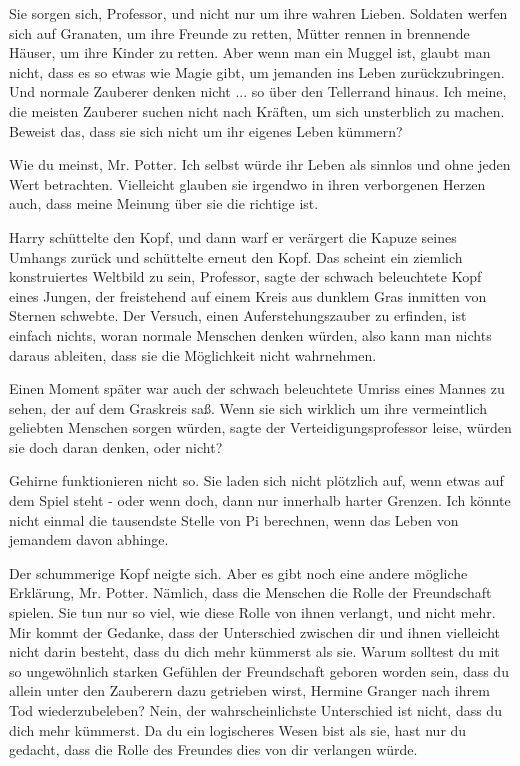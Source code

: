 \glqq{}Sie sorgen sich, Professor, und nicht nur um ihre wahren Lieben. Soldaten
werfen sich auf Granaten, um ihre Freunde zu retten, Mütter rennen in brennende
Häuser, um ihre Kinder zu retten. Aber wenn man ein Muggel ist, glaubt man
nicht, dass es so etwas wie Magie gibt, um jemanden ins Leben zurückzubringen.
Und normale Zauberer denken nicht ... so über den Tellerrand hinaus. Ich meine,
die meisten Zauberer suchen nicht nach Kräften, um sich unsterblich zu machen.
Beweist das, dass sie sich nicht um ihr eigenes Leben kümmern?\grqq{}

\glqq{}Wie du meinst, Mr. Potter. Ich selbst würde ihr Leben als sinnlos und ohne
jeden Wert betrachten. Vielleicht glauben sie irgendwo in ihren verborgenen
Herzen auch, dass meine Meinung über sie die richtige ist.\grqq{}

Harry schüttelte den Kopf, und dann warf er verärgert die Kapuze seines Umhangs
zurück und schüttelte erneut den Kopf. \glqq{}Das scheint ein ziemlich
konstruiertes Weltbild zu sein, Professor\grqq{}, sagte der schwach beleuchtete
Kopf eines Jungen, der freistehend auf einem Kreis aus dunklem Gras inmitten von
Sternen schwebte. \glqq{}Der Versuch, einen Auferstehungszauber zu erfinden, ist
einfach nichts, woran normale Menschen denken würden, also kann man nichts
daraus ableiten, dass sie die Möglichkeit nicht wahrnehmen.\grqq{}

Einen Moment später war auch der schwach beleuchtete Umriss eines Mannes zu
sehen, der auf dem Graskreis saß. \glqq{}Wenn sie sich wirklich um ihre
vermeintlich geliebten Menschen sorgen würden\grqq{}, sagte der
Verteidigungsprofessor leise, \glqq{}würden sie doch daran denken, oder
nicht?\grqq{}

\glqq{}Gehirne funktionieren nicht so. Sie laden sich nicht plötzlich auf, wenn
etwas auf dem Spiel steht - oder wenn doch, dann nur innerhalb harter Grenzen.
Ich könnte nicht einmal die tausendste Stelle von Pi berechnen, wenn das Leben
von jemandem davon abhinge.\grqq{}

Der schummerige Kopf neigte sich. \glqq{}Aber es gibt noch eine andere mögliche
Erklärung, Mr. Potter. Nämlich, dass die Menschen die Rolle der Freundschaft
spielen. Sie tun nur so viel, wie diese Rolle von ihnen verlangt, und nicht
mehr. Mir kommt der Gedanke, dass der Unterschied zwischen dir und ihnen
vielleicht nicht darin besteht, dass du dich mehr kümmerst als sie. Warum
solltest du mit so ungewöhnlich starken Gefühlen der Freundschaft geboren worden
sein, dass du allein unter den Zauberern dazu getrieben wirst, Hermine Granger
nach ihrem Tod wiederzubeleben? Nein, der wahrscheinlichste Unterschied ist
nicht, dass du dich mehr kümmerst. Da du ein logischeres Wesen bist als sie,
hast nur du gedacht, dass die Rolle des Freundes dies von dir verlangen
würde.\grqq{}

